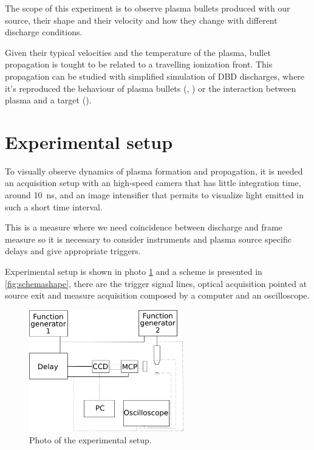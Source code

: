 The scope of this experiment is to observe plasma bullets produced with our source, their shape and their velocity and how they change with different discharge conditions.

Given their typical velocities and the temperature of the plasma, bullet propagation is tought to be related to a travelling ionization front. This propagation can be studied with simplified simulation of DBD discharges, where it's reproduced the behaviour of plasma bullets (\cite{doi:10.1063/1.4963115}, \cite{Breden_2012}) or the interaction between plasma and a target (\cite{doi:10.1063/1.4923345}).

\section{Experimental setup}
To visually observe dynamics of plasma formation and propagation, it is needed an acquisition setup with an high-speed camera that has little integration time, around \SI{10}{\nano\second}, and an image intensifier that permits to visualize light emitted in such a short time interval.

This is a measure where we need coincidence between discharge and frame measure so it is necessary to consider instruments and plasma source specific delays and give appropriate triggers.

Experimental setup is shown in photo \ref{fig:fotosetup} and a scheme is presented in \ref{fig:schemashape}, there are the trigger signal lines, optical acquisition pointed at source exit and measure acquisition composed by a computer and an oscilloscope. 
\begin{figure}
 \centering
 \includegraphics[width=0.6\textwidth]{Images/Shape/acq_ottica.png}
 \caption{Photo of the experimental setup.}
 \label{fig:fotosetup}
\end{figure}

